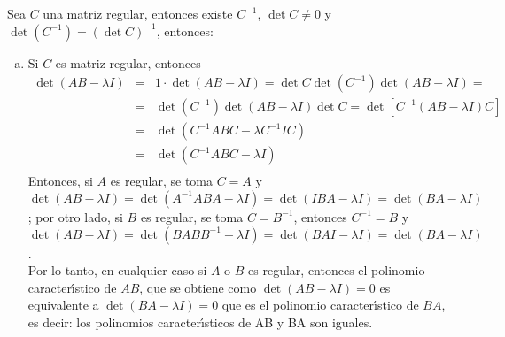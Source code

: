 \begin{solucion}
 Sea $C$ una matriz regular, entonces existe $C^{-1}$, $\det C \neq 0$ y $\det (C^{-1}) = \left( \det C \right)^{-1}$, entonces:
 \begin{enumerate}[a)]
  \item Si $C$ es matriz regular, entonces
  \begin{eqnarray*}
   \det (AB - \lambda I) & = & 1\cdot \det (AB - \lambda I) = \det C \det (C^{-1}) \det (AB - \lambda I) = \\
   & = &\det (C^{-1}) \det (AB - \lambda I) \det C = \det \left[ C^{-1}(AB - \lambda I) C \right] \\
   & = & \det (C^{-1}ABC - \lambda C^{-1}I C) \\
   & = & \det (C^{-1}ABC - \lambda I) \\ 
  \end{eqnarray*}
  Entonces, si $A$ es regular, se toma $C = A$ y $\det(AB-\lambda I) = \det(A^{-1}ABA - \lambda I) = \det(IBA - \lambda I) = \det (BA - \lambda I)$; por otro lado, si $B$ es regular, se toma $C = B^{-1}$, entonces $C^{-1} = B$ y $\det(AB-\lambda I) = \det (BABB^{-1} - \lambda I) = \det (BAI - \lambda I) = \det(BA - \lambda I)$. \\
  Por lo tanto, en cualquier caso si $A$ o $B$ es regular, entonces el polinomio caracter\'{\i}stico de $AB$, que se obtiene como $\det(AB - \lambda I) = 0$ es equivalente a $\det(BA - \lambda I) = 0$ que es el polinomio caracter\'{\i}stico de $BA$, es decir: los polinomios caracter\'{\i}sticos de AB y BA son iguales.
  

\end{enumerate}
\end{solucion}
